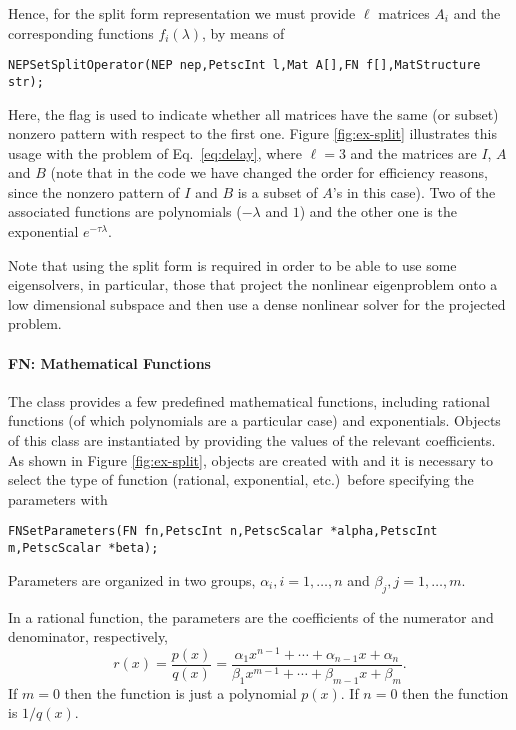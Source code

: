 Hence, for the split form representation we must provide $\ell$ matrices $A_i$ and the corresponding functions $f_i(\lambda)$, by means of%
	\begin{Verbatim}[fontsize=\small]
	NEPSetSplitOperator(NEP nep,PetscInt l,Mat A[],FN f[],MatStructure str);
	\end{Verbatim}
Here, the  flag is used to indicate whether all matrices have the same (or subset) nonzero pattern with respect to the first one.
Figure \ref{fig:ex-split} illustrates this usage with the problem of Eq.\ \ref{eq:delay}, where $\ell=3$ and the matrices are $I$, $A$ and $B$ (note that in the code we have changed the order for efficiency reasons, since the nonzero pattern of $I$ and $B$ is a subset of $A$'s in this case). Two of the associated functions are polynomials ($-\lambda$ and $1$) and the other one is the exponential $e^{-\tau\lambda}$.

Note that using the split form is required in order to be able to use some eigensolvers, in particular, those that project the nonlinear eigenproblem onto a low dimensional subspace and then use a dense nonlinear solver for the projected problem.

\paragraph{FN: Mathematical Functions}

The  class provides a few predefined mathematical functions, including rational functions (of which polynomials are a particular case) and exponentials. Objects of this class are instantiated by providing the values of the relevant coefficients. As shown in Figure \ref{fig:ex-split},  objects are created with  and it is necessary to select the type of function (rational, exponential, etc.)\ before specifying the parameters with
	\begin{Verbatim}[fontsize=\small]
     FNSetParameters(FN fn,PetscInt n,PetscScalar *alpha,PetscInt m,PetscScalar *beta);
	\end{Verbatim}
Parameters are organized in two groups, $\alpha_i,i=1,\ldots,n$ and $\beta_j,j=1,\ldots,m$.

In a rational function, the parameters are the coefficients of the numerator and denominator, respectively,
\begin{equation}
r(x)=\frac{p(x)}{q(x)}
=\frac{\alpha_1x^{n-1}+\cdots+\alpha_{n-1}x+\alpha_{n}}{\beta_1x^{m-1}+\cdots+\beta_{m-1}x+\beta_{m}}.
\end{equation}
If $m=0$ then the function is just a polynomial $p(x)$. If $n=0$ then the function is $1/q(x)$.

